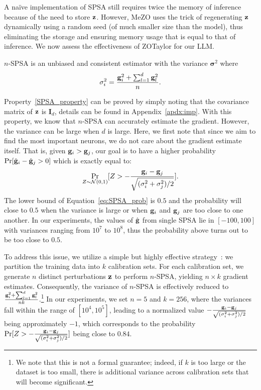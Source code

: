 A na\"ive implementation of SPSA still requires twice the memory of inference because of the need to store ${\mathbf{z}}$. However, MeZO uses the trick of regenerating ${\mathbf{z}}$ dynamically using a random seed (of much smaller size than the model), thus eliminating the storage and ensuring memory usage that is equal to that of inference. We now assess the effectiveness of ZOTaylor for our LLM.

\begin{property}[] \label{SPSA_property}
$n$-SPSA is an unbiased and consistent estimator with the variance $\mathbf{\sigma}^2$ where 
\[\mathbf{\sigma}_i^2 = \frac{{\mathbf{g}}_i^2 + \sum_{l=1}^d {\mathbf{g}}_l^2}{n}.\] 
\end{property}
Property~\ref{SPSA_property} can be proved by simply noting that the covariance matrix of ${\mathbf{z}}$ is $\mathbf{I}_d$, details can be found in Appendix~\ref{apdx:imp}. With this property, we know that $n$-SPSA can accurately estimate the gradient. However, the variance can be large when  $d$ is large. Here, we first note that since we aim to find the most important neurons, we do not care about the gradient estimate itself. That is, given ${\mathbf{g}}_i>{\mathbf{g}}_j$, our goal is to have a higher probability $\Pr[\hat{{\mathbf{g}}}_i-\hat{{\mathbf{g}}}_j>0]$ which is exactly equal to: 
\begin{align}
    \Pr_{Z \sim \mathcal{N}(0,1)} [Z>-\frac{{\mathbf{g}}_i-{\mathbf{g}}_j}{\sqrt{(\sigma_i^2+\sigma_j^2)/2}}]. \label{eq:SPSA_prob}
\end{align}
The lower bound of Equation~\ref{eq:SPSA_prob} is $0.5$ and the probability will close to $0.5$ when the variance is large or when ${\mathbf{g}}_i$ and ${\mathbf{g}}_j$ are too close to one another. In our experiments, the values of $\hat{{\mathbf{g}}}$ from single SPSA lie in $[-100,100]$ with variances ranging from $10^7$ to $10^8$, thus the probability above turns out to be too close to $0.5$.

To address this issue, we utilize a simple but highly effective strategy~\citep{j2015variance}: we partition the training data into $k$ calibration sets. For each calibration set, we generate $n$ distinct perturbations ${\mathbf{z}}$ to perform $n$-SPSA, yielding $n\times k$ gradient estimates. Consequently, the variance of $n$-SPSA is effectively reduced to $\frac{{\mathbf{g}}_i^2 + \sum_{l=1}^d {\mathbf{g}}_l^2}{nk}$.\footnote{We note that this is not a formal guarantee; indeed, if $k$ is too large or the dataset is too small, there is additional variance across calibration sets that will become significant.} In our experiments, we set $n=5$ and $k=256$, where the variances fall within the range of $[10^4, 10^5]$, leading to a normalized value $-\frac{{\mathbf{g}}_i-{\mathbf{g}}_j}{\sqrt{(\sigma_i^2+\sigma_j^2)/2}}$ being approximately $-1$, which corresponds to the probability $\Pr[Z>-\frac{{\mathbf{g}}_i-{\mathbf{g}}_j}{\sqrt{(\sigma_i^2+\sigma_j^2)/2}}]$ being close to $0.84$. 

